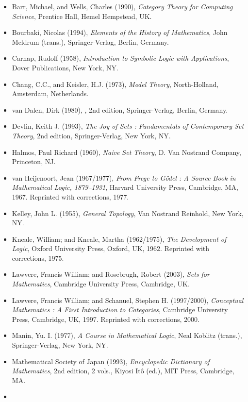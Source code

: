 \documentclass[12pt]{article}
\begin{document}
\begin{itemize}
\item
Barr, Michael, and Wells, Charles (1990), \textit{Category Theory for Computing Science}, Prentice Hall, Hemel Hempstead, UK.
\item
Bourbaki, Nicolas (1994), \textit{Elements of the History of Mathematics}, John Meldrum (trans.), Springer-Verlag, Berlin, Germany.
\item
Carnap, Rudolf (1958), \textit{Introduction to Symbolic Logic with Applications}, Dover Publications, New York, NY.
\item
Chang, C.C., and Keisler, H.J. (1973), \textit{Model Theory}, North-Holland, Amsterdam, Netherlands.
\item
van Dalen, Dirk (1980), , 2nd edition, Springer-Verlag, Berlin, Germany.
\item
Devlin, Keith J. (1993), \textit{The Joy of Sets : Fundamentals of Contemporary Set Theory}, 2nd edition, Springer-Verlag, New York, NY.
\item
Halmos, Paul Richard (1960), \textit{Naive Set Theory}, D. Van Nostrand Company, Princeton, NJ.
\item
van Heijenoort, Jean (1967/1977), \textit{From Frege to G\"{o}del : A Source Book in Mathematical Logic, 1879--1931}, Harvard University Press, Cambridge, MA, 1967.  Reprinted with corrections, 1977.
\item
Kelley, John L. (1955), \textit{General Topology}, Van Nostrand Reinhold, New York, NY.
\item
Kneale, William; and Kneale, Martha (1962/1975), \textit{The Development of Logic}, Oxford University Press, Oxford, UK, 1962.  Reprinted with corrections, 1975.
\item
Lawvere, Francis William; and Rosebrugh, Robert (2003), \textit{Sets for Mathematics}, Cambridge University Press, Cambridge, UK.
\item
Lawvere, Francis William; and Schanuel, Stephen H. (1997/2000), \textit{Conceptual Mathematics : A First Introduction to Categories}, Cambridge University Press, Cambridge, UK, 1997.  Reprinted with corrections, 2000.
\item
Manin, Yu. I. (1977), \textit{A Course in Mathematical Logic}, Neal Koblitz (trans.), Springer-Verlag, New York, NY.
\item
Mathematical Society of Japan (1993), \textit{Encyclopedic Dictionary of Mathematics}, 2nd edition, 2 vols., Kiyosi It\^{o} (ed.), MIT Press, Cambridge, MA.
\item

\end{itemize}
\end{document}

